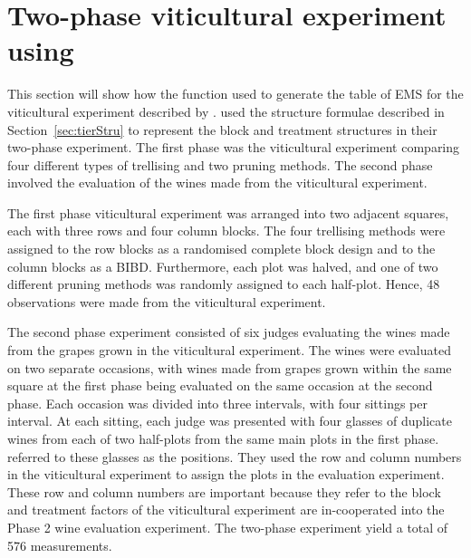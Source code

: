 \documentclass[article]{jss}
\begin{document}
\section[Example]{Two-phase viticultural experiment using }\label{sec:example}
This section will show how the function  used to generate the table of EMS for the viticultural experiment described by \cite{Brien1999}. \cite{Brien1999} used the structure formulae described in Section~\ref{sec:tierStru} to represent the block and treatment structures in their two-phase experiment. The first phase was the viticultural experiment comparing four different types of trellising and two pruning methods. The second phase involved the evaluation of the wines made from the viticultural experiment.


The first phase viticultural experiment was arranged into two adjacent squares, each with three rows and four column blocks. The four trellising methods were assigned to the row blocks as a randomised complete block design and to the column blocks as a BIBD. Furthermore, each plot was halved, and one of two different pruning methods was randomly assigned to each half-plot. Hence, 48 observations were made from the viticultural experiment.

The second phase experiment consisted of six judges evaluating the wines made from the grapes grown in the viticultural experiment. The wines were evaluated on two separate occasions, with wines made from grapes grown within the same square at the first phase being evaluated on the same occasion at the second phase. Each occasion was divided into three intervals, with four sittings per interval. At each sitting, each judge was presented with four glasses of duplicate wines from each of two half-plots from the same main plots in the first phase. \cite{Brien1999} referred to these glasses as the positions. They used the row and column numbers in the viticultural experiment to assign the plots in the evaluation experiment. These row and column numbers are important because they refer to the block and treatment factors of the viticultural experiment are in-cooperated into the Phase 2 wine evaluation experiment. The two-phase experiment yield a total of 576 measurements.
\end{document}

